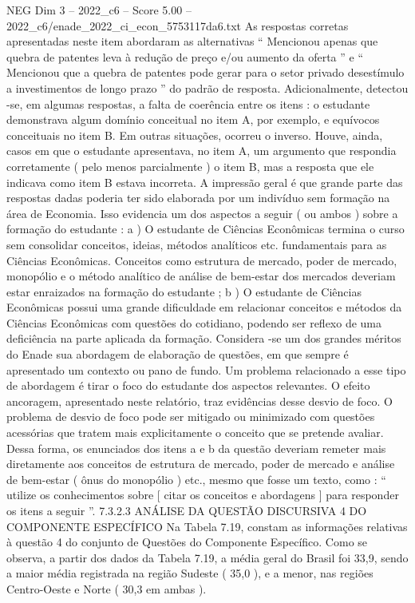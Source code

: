 \begin{textsample}{NEG Dim 3 – 2022\_c6 – Score 5.00 – 2022\_c6/enade\_2022\_ci\_econ\_5753117da6.txt}
As respostas corretas apresentadas neste item abordaram as alternativas “ Mencionou apenas que quebra de patentes leva à redução de preço e/ou aumento da oferta ” e “ Mencionou que a quebra de patentes pode gerar para o setor privado desestímulo a investimentos de longo prazo ” do padrão de resposta.
Adicionalmente, detectou -se, em algumas respostas, a falta de coerência entre os itens : o estudante demonstrava algum domínio conceitual no item A, por exemplo, e equívocos conceituais no item B.
Em outras situações, ocorreu o inverso.
Houve, ainda, casos em que o estudante apresentava, no item A, um argumento que respondia corretamente ( pelo menos parcialmente ) o item B, mas a resposta que ele indicava como item B estava incorreta.
A impressão geral é que grande parte das respostas dadas poderia ter sido elaborada por um indivíduo sem formação na área de Economia.
Isso evidencia um dos aspectos a seguir ( ou ambos ) sobre a formação do estudante : a ) O estudante de Ciências Econômicas termina o curso sem consolidar conceitos, ideias, métodos analíticos etc. fundamentais para as Ciências Econômicas.
Conceitos como estrutura de mercado, poder de mercado, monopólio e o método analítico de análise de bem-estar dos mercados deveriam estar enraizados na formação do estudante ; b ) O estudante de Ciências Econômicas possui uma grande dificuldade em relacionar conceitos e métodos da Ciências Econômicas com questões do cotidiano, podendo ser reflexo de uma deficiência na parte aplicada da formação.
Considera -se um dos grandes méritos do Enade sua abordagem de elaboração de questões, em que sempre é apresentado um contexto ou pano de fundo.
Um problema relacionado a esse tipo de abordagem é tirar o foco do estudante dos aspectos relevantes.
O efeito ancoragem, apresentado neste relatório, traz evidências desse desvio de foco.
O problema de desvio de foco pode ser mitigado ou minimizado com questões acessórias que tratem mais explicitamente o conceito que se pretende avaliar.
Dessa forma, os enunciados dos itens a e b da questão deveriam remeter mais diretamente aos conceitos de estrutura de mercado, poder de mercado e análise de bem-estar ( ônus do monopólio ) etc., mesmo que fosse um texto, como : “ utilize os conhecimentos sobre [ citar os conceitos e abordagens ] para responder os itens a seguir ”. 7.3.2.3 ANÁLISE DA QUESTÃO DISCURSIVA 4 DO COMPONENTE ESPECÍFICO Na Tabela 7.19, constam as informações relativas à questão 4 do conjunto de Questões do Componente Específico.
Como se observa, a partir dos dados da Tabela 7.19, a média geral do Brasil foi 33,9, sendo a maior média registrada na região Sudeste ( 35,0 ), e a menor, nas regiões Centro-Oeste e Norte ( 30,3 em ambas ).

\end{textsample}
